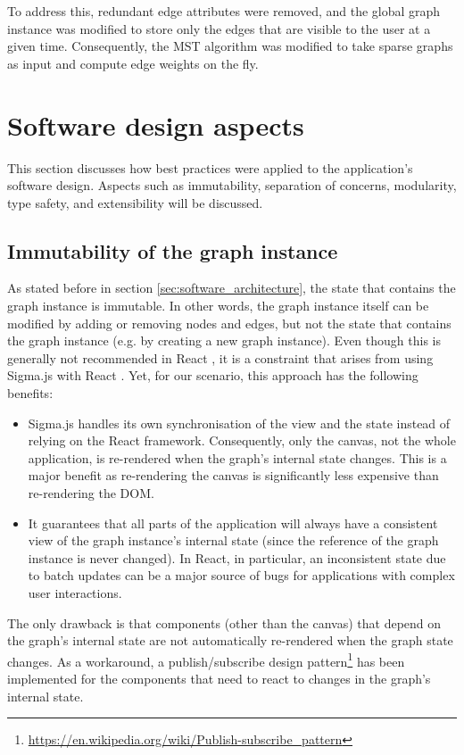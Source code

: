 \documentclass{l4proj}
\begin{document}
To address this, redundant edge attributes were removed, and the global graph instance was modified to store only the edges that are visible to the user at a given time.
Consequently, the MST algorithm was modified to take sparse graphs as input and compute edge weights on the fly.

\section{Software design aspects}
This section discusses how best practices were applied to the application's software design. Aspects such as immutability, separation of concerns, modularity, type safety, and extensibility will be discussed.
\subsection{Immutability of the graph instance}
\label{sec:immutability}
As stated before in section \ref{sec:software_architecture}, the state that contains the graph instance is immutable. In other words, the graph instance itself can be modified by adding or removing nodes and edges, but not the state that contains the graph instance (e.g. by creating a new graph instance).
Even though this is generally not recommended in React \citep{React_update_object_state}, it is a constraint that arises from using Sigma.js with React \citep{React_sigma_js}. Yet, for our scenario, this approach has the following benefits:
\begin{itemize}
    \item Sigma.js handles its own synchronisation of the view and the state instead of relying on the React framework. Consequently, only the canvas, not the whole application, is re-rendered when the graph's internal state changes. This is a major benefit as re-rendering the canvas is significantly less expensive than re-rendering the DOM.
    \item It guarantees that all parts of the application will always have a consistent view of the graph instance's internal state (since the reference of the graph instance is never changed). In React, in particular, an inconsistent state due to batch updates can be a major source of bugs for applications with complex user interactions.
\end{itemize}

The only drawback is that components (other than the canvas) that depend on the graph's internal state are not automatically re-rendered when the graph state changes. As a workaround, a publish/subscribe design pattern\footnote{\url{https://en.wikipedia.org/wiki/Publish-subscribe\_pattern}} has been implemented for the components that need to react to changes in the graph's internal state.
\end{document}
